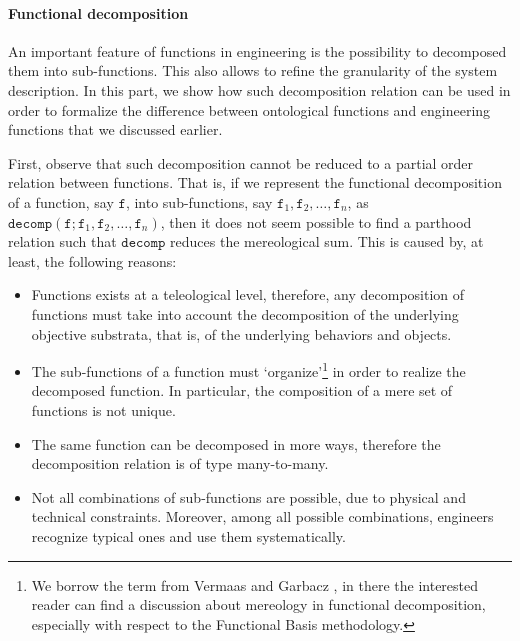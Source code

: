 \documentclass[sw]{iosart2x}
\newcommand{\generalStyle}[1]{\texttt{#1}}
\newcommand{\cst}[1]{\ensuremath{\mathtt{#1}}}
\newcommand{\decom}{\generalStyle{decomp}}
\newcommand{\TODO}[1]{{\color{red} #1}}
\begin{document}
\paragraph{Functional decomposition}
An important feature of functions in engineering is the possibility to decomposed them into sub-functions. This also allows to refine the granularity of the system description. In this part, we show how such decomposition relation can be used in order to formalize the difference between ontological functions and engineering functions that we discussed earlier.

First, observe that such decomposition cannot be reduced to a partial order relation between functions. %
That is, if we represent the functional decomposition of a function, say $\cst{f}$, into sub-functions, say $\cst{f}_1, \cst{f}_2, \dots, \cst{f}_n$, as $\decom(\cst{f};\cst{f}_1,\cst{f}_2,\dots,\cst{f}_n)$, then it does not seem possible to find a parthood relation such that $\decom$ reduces the mereological sum.
This is caused by, at least, the following reasons:
\begin{itemize}
  \item Functions exists at a teleological level, therefore, any decomposition of functions must take into account the decomposition of the underlying objective substrata, that is, of the underlying behaviors and objects.
  \item The sub-functions of a function must `organize'\footnote{We borrow the term from Vermaas and Garbacz \cite{vermaasFunctionalDecompositionMereology2009a}, in there the interested reader can find a discussion about mereology in functional decomposition, especially with respect to the Functional Basis methodology.} in order to realize the decomposed function. In particular, the composition of a mere set of functions is not unique.
  \item The same function can be decomposed in more ways, therefore the decomposition relation is of type many-to-many.
  \item Not all combinations of sub-functions are possible, due to physical and technical constraints. 
  Moreover, among all possible combinations, engineers recognize typical ones and use them systematically. 
\end{itemize}
\end{document}
